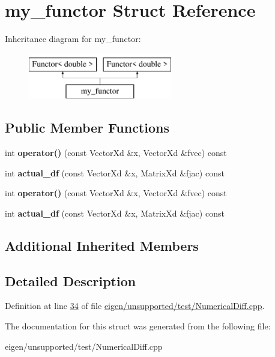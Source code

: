 \hypertarget{structmy__functor}{}\section{my\+\_\+functor Struct Reference}
\label{structmy__functor}
Inheritance diagram for my\+\_\+functor\+:\begin{figure}[H]
\begin{center}
\leavevmode
\includegraphics[height=2.000000cm]{structmy__functor}
\end{center}
\end{figure}
\subsection*{Public Member Functions}
\begin{DoxyCompactItemize}
\item 
\mbox{\label{structmy__functor_a6a4fd38e0e18987a2b8f6e42a7305cf1}} 
int {\bfseries operator()} (const Vector\+Xd \&x, Vector\+Xd \&fvec) const
\item 
\mbox{\label{structmy__functor_ae9b15901b23e3b0e04d37cb6b70db82d}} 
int {\bfseries actual\+\_\+df} (const Vector\+Xd \&x, Matrix\+Xd \&fjac) const
\item 
\mbox{\label{structmy__functor_a6a4fd38e0e18987a2b8f6e42a7305cf1}} 
int {\bfseries operator()} (const Vector\+Xd \&x, Vector\+Xd \&fvec) const
\item 
\mbox{\label{structmy__functor_ae9b15901b23e3b0e04d37cb6b70db82d}} 
int {\bfseries actual\+\_\+df} (const Vector\+Xd \&x, Matrix\+Xd \&fjac) const
\end{DoxyCompactItemize}
\subsection*{Additional Inherited Members}


\subsection{Detailed Description}


Definition at line \hyperlink{eigen_2unsupported_2test_2_numerical_diff_8cpp_source_l00034}{34} of file \hyperlink{eigen_2unsupported_2test_2_numerical_diff_8cpp_source}{eigen/unsupported/test/\+Numerical\+Diff.\+cpp}.



The documentation for this struct was generated from the following file\+:\begin{DoxyCompactItemize}
\item 
eigen/unsupported/test/\+Numerical\+Diff.\+cpp\end{DoxyCompactItemize}
